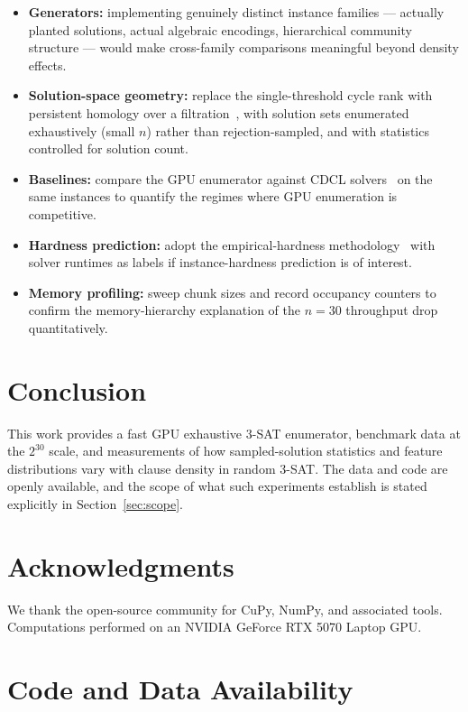 \documentclass[11pt]{article}
\newcommand{\SAT}{\textsf{SAT}}
\begin{document}
\begin{itemize}
\item \textbf{Generators:} implementing genuinely distinct instance families --- actually planted solutions, actual algebraic encodings, hierarchical community structure --- would make cross-family comparisons meaningful beyond density effects.
\item \textbf{Solution-space geometry:} replace the single-threshold cycle rank with persistent homology over a filtration~\cite{EdelsbrunnerHarer2010}, with solution sets enumerated exhaustively (small $n$) rather than rejection-sampled, and with statistics controlled for solution count.
\item \textbf{Baselines:} compare the GPU enumerator against CDCL solvers~\cite{MiniSat} on the same instances to quantify the regimes where GPU enumeration is competitive.
\item \textbf{Hardness prediction:} adopt the empirical-hardness methodology~\cite{SATzilla} with solver runtimes as labels if instance-hardness prediction is of interest.
\item \textbf{Memory profiling:} sweep chunk sizes and record occupancy counters to confirm the memory-hierarchy explanation of the $n=30$ throughput drop quantitatively.
\end{itemize}

\section{Conclusion}

This work provides a fast GPU exhaustive 3-\SAT{} enumerator, benchmark data at the $2^{30}$ scale, and measurements of how sampled-solution statistics and feature distributions vary with clause density in random 3-\SAT{}. The data and code are openly available, and the scope of what such experiments establish is stated explicitly in Section~\ref{sec:scope}.

\section*{Acknowledgments}

We thank the open-source community for CuPy, NumPy, and associated tools. Computations performed on an NVIDIA GeForce RTX 5070 Laptop GPU.

\section*{Code and Data Availability}
\end{document}
